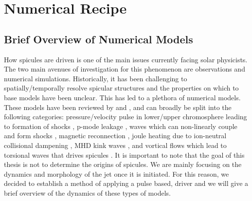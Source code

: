 \chapter{Numerical Recipe}
\label{chap:Numerical_Recipe}
\section{Brief Overview of Numerical Models}
\label{sec:models}
How spicules are driven is one of the main issues currently facing solar physicists. The two main avenues of investigation for this phenomenon are observations and numerical simulations. Historically, it has been challenging to spatially/temporally resolve spicular structures and the properties on which to base models have been unclear. This has led to a plethora of numerical models. These models have been reviewed by \cite{Sterling_2000SoPh} and \cite{Aschwanden2019ASSL}, and can broadly be split into the following categories: pressure/velocity pulse in lower/upper chromosphere leading to formation of shocks \citep{Shibata1982,Suematsu1982SoPh7599S,Hollweg1982ApJ257345H,Sterling1990ApJ349647S,Heggland2007ApJ6661277H,kuzma2017ApJ84978K}, p-mode leakage \citep{Pontieu2004Natur},  \Alfven waves which can non-linearly couple and form shocks \citep{Hollweg1982SoPh7535H,Hollweg1992ApJ389731H, Kudoh1999ApJ514493K, Matsumoto2010ApJ7101857M}, magnetic reconnection \citep{Yokoyama1995Natur37542Y,Yokoyama1996PASJ48353Y, Archontis2005ApJ6351299A, Pontieu2007PASJ,Isobe2008ApJ679L57I,Nishizuka2008ApJ683L83N,Sterling2010ApJ,Gonz2017ApJ,Gonz2018arXiv180704224G,Gonz2018ApJ856176G}, joule heating due to ion-neutral collisional dampening \citep{Haerendel1992Natur360241H,James2002AA393L11J,James2003AA,Erd2004AA4271055E}, MHD kink waves \citep{Kukhianidze2006AA}, and vortical flows which lead to torsional \Alfven waves that drives spicules \citep{Iijima2017ApJ,Samanta2019Sci}. \np
%
It is important to note that the goal of this thesis is not to determine the origins of spicules. We are mainly focusing on the dynamics and morphology of the jet once it is initiated. For this reason, we decided to establish a method of applying a pulse based, driver and we will give a brief overview of the dynamics of these types of models. 
